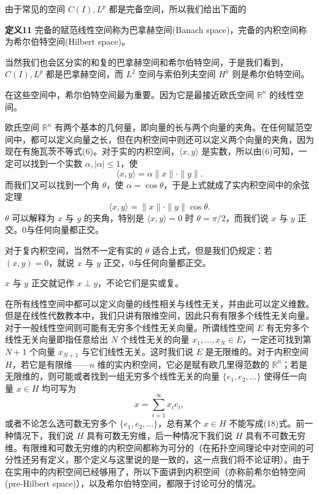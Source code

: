 由于常见的空间 $C(I),L^p$ 都是完备空间，所以我们给出下面的

\noindent\textbf{定义11}\quad
完备的赋范线性空间称为巴拿赫空间(Banach space)，完备的内积空间称为希尔伯特空间(Hilbert space)。

当然我们也会区分实的和复的巴拿赫空间和希尔伯特空间，于是我们看到，$C(I),L^p$ 都是巴拿赫空间，而 $L^2$ 空间与索伯列夫空间 $H^k$ 则是希尔伯特空间。

在这些空间中，希尔伯特空间最为重要。因为它是最接近欧氏空间 $\mathbb R^n$ 的线性空间。

欧氏空间 $\mathbb R^n$ 有两个基本的几何量，即向量的长与两个向量的夹角。在任何赋范空间中，都可以定义向量之长，但在内积空间中则还可以定义两个向量的夹角，因为现在有施瓦茨不等式(6)。对于实的内积空间，$\langle x,y\rangle$ 是实数，所以由(6)可知，一定可以找到一个实数 $\alpha,|\alpha|\le1$，使
\[
 \langle x,y\rangle=\alpha\|x\|\cdot\|y\|.
\]
而我们又可以找到一个角 $\theta$，使 $\alpha=\cos\theta$，于是上式就成了实内积空间中的余弦定理
\[
 \langle x,y\rangle=\|x\|\cdot\|y\|\cos\theta.
\]
$\theta$ 可以解释为 $x$ 与 $y$ 的夹角，特别是 $\langle x,y\rangle=0$ 时 $\theta=\pi/2$，而我们说 $x$ 与 $y$ 正交。0与任何向量都正交。

对于复内积空间，当然不一定有实的 $\theta$ 适合上式，但是我们仍规定：若 $(x,y)=0$，就说 $x$ 与 $y$ 正交，0与任何向量都正交。


$x$ 与 $y$ 正交就记作 $x\perp y$，不论它们是实或复。

在所有线性空间中都可以定义向量的线性相关与线性无关，并由此可以定义维数。但是在线性代数教本中，我们只讲有限维空间，因此只有有限多个线性无关向量。对于一般线性空间则可能有无穷多个线性无关向量。所谓线性空间 $E$ 有无穷多个线性无关向量即指任意给出 $N$ 个线性无关的向量 $x_1,\ldots,x_N\in E$，一定还可找到第 $N+1$ 个向量 $x_{N+1}$ 与它们线性无关。这时我们说 $E$ 是无限维的。对于内积空间 $H$，若它是有限维——$n$ 维的实内积空间，它必是赋有欧几里得范数的 $\mathbb R^n$；若是无限维的，则可能或者找到一组无穷多个线性无关的向量 $\{e_1,e_2,\ldots\}$ 使得任一向量 $x\in H$ 均可写为
\begin{equation}
 x=\sum_{i=1}^\infty x_i e_i,
 \tag{18}
\end{equation}
或者不论怎么选可数无穷多个 $\{e_1,e_2,\ldots\}$，总有某个 $x\in H$ 不能写成(18)式。前一种情况下，我们说 $H$ 具有可数无穷维，后一种情况下我们说 $H$ 具有不可数无穷维。有限维和可数无穷维的内积空间都称为可分的（在拓扑空间理论中对空间的可分性还另有定义，那个定义与这里说的是一致的，这一点我们将不论证明）。由于在实用中的内积空间已经够用了，所以下面讲到内积空间（亦称前希尔伯特空间(pre-Hilbert space)），以及希尔伯特空间，都限于讨论可分的情况。

